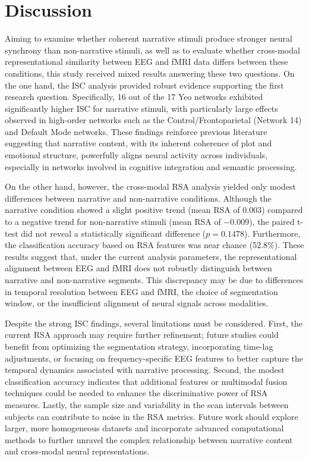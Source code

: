 \documentclass[stu,12pt,floatsintext]{apa7}
\begin{document}
\section{Discussion}
Aiming to examine whether coherent narrative stimuli produce stronger neural synchrony than non-narrative stimuli, as well as to evaluate whether cross-modal representational similarity between EEG and fMRI data differs between these conditions, this study received mixed results answering these two questions. On the one hand, the ISC analysis provided robust evidence supporting the first research question. Specifically, 16 out of the 17 Yeo networks exhibited significantly higher ISC for narrative stimuli, with particularly large effects observed in high-order networks such as the Control/Frontoparietal (Network 14) and Default Mode networks. These findings reinforce previous literature suggesting that narrative content, with its inherent coherence of plot and emotional structure, powerfully aligns neural activity across individuals, especially in networks involved in cognitive integration and semantic processing.

On the other hand, however, the cross-modal RSA analysis yielded only modest differences between narrative and non-narrative conditions. Although the narrative condition showed a slight positive trend (mean RSA of 0.003) compared to a negative trend for non-narrative stimuli (mean RSA of $-0.009$), the paired t-test did not reveal a statistically significant difference ($p=0.1478$). Furthermore, the classification accuracy based on RSA features was near chance (52.8\%). These results suggest that, under the current analysis parameters, the representational alignment between EEG and fMRI does not robustly distinguish between narrative and non-narrative segments. This discrepancy may be due to differences in temporal resolution between EEG and fMRI, the choice of segmentation window, or the insufficient alignment of neural signals across modalities.

Despite the strong ISC findings, several limitations must be considered. First, the current RSA approach may require further refinement; future studies could benefit from optimizing the segmentation strategy, incorporating time-lag adjustments, or focusing on frequency-specific EEG features to better capture the temporal dynamics associated with narrative processing. Second, the modest classification accuracy indicates that additional features or multimodal fusion techniques could be needed to enhance the discriminative power of RSA measures. Lastly, the sample size and variability in the scan intervals between subjects can contribute to noise in the RSA metrics. Future work should explore larger, more homogeneous datasets and incorporate advanced computational methods to further unravel the complex relationship between narrative content and cross-modal neural representations.

\printbibliography
\end{document}

